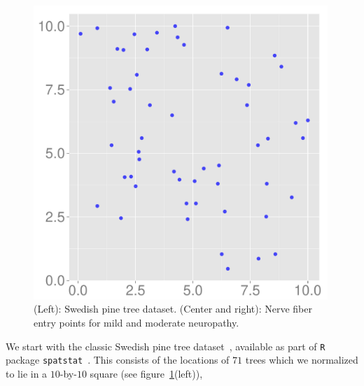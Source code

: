 \documentclass{statsoc}
\begin{document}
\begin{figure}
\begin{minipage}[h]{0.32\linewidth}
  \end{minipage}
  \begin{minipage}[h]{0.32\linewidth}
  \centering
  \includegraphics[width=0.99\textwidth]{figs/mod1.pdf}
  \end{minipage}
  \caption[Post Pred]{(Left): Swedish pine tree dataset. (Center and right): Nerve fiber entry points for mild and moderate neuropathy.}
  \label{fig:diab}
  \end{figure}
  We start with the classic Swedish pine tree dataset~\citep{Ripley88},
available as part of \texttt{R} package \texttt{spatstat}~\citep{spatstat}. 
This consists of the locations of $71$ trees which we normalized to lie in a $10$-by-$10$ square (see figure~\ref{fig:diab}(left)), 
\end{document}
